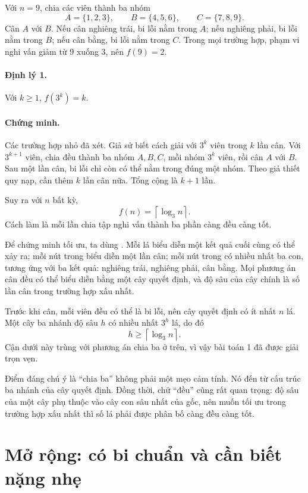 \documentclass[11pt]{article}
\begin{document}
Với \(n=9\), chia các viên thành ba nhóm
\[
  A=\{1,2,3\},\qquad B=\{4,5,6\},\qquad C=\{7,8,9\}.
\]
Cân \(A\) với \(B\). Nếu cân nghiêng trái, bi lỗi nằm trong \(A\); nếu nghiêng
phải, bi lỗi nằm trong \(B\); nếu cân bằng, bi lỗi nằm trong \(C\). Trong mọi
trường hợp, phạm vi nghi vấn giảm từ \(9\) xuống \(3\), nên \(f(9)=2\).

\paragraph{Định lý 1.}
Với \(k\ge 1\), \(f(3^k)=k\).

\paragraph{Chứng minh.}
Các trường hợp nhỏ đã xét. Giả sử biết cách giải với \(3^k\) viên trong
\(k\) lần cân. Với \(3^{k+1}\) viên, chia đều thành ba nhóm \(A,B,C\), mỗi
nhóm \(3^k\) viên, rồi cân \(A\) với \(B\). Sau một lần cân, bi lỗi chỉ còn
có thể nằm trong đúng một nhóm. Theo giả thiết quy nạp, cần thêm \(k\) lần cân
nữa. Tổng cộng là \(k+1\) lần.

Suy ra với \(n\) bất kỳ,
\[
  f(n)=\left\lceil \log_3 n \right\rceil .
\]
Cách làm là mỗi lần chia tập nghi vấn thành ba phần càng đều càng tốt.

Để chứng minh tối ưu, ta dùng . Mỗi lá biểu diễn một kết
quả cuối cùng có thể xảy ra; mỗi nút trong biểu diễn một lần cân; mỗi nút
trong có nhiều nhất ba con, tương ứng với ba kết quả: nghiêng trái, nghiêng
phải, cân bằng. Mọi phương án cân đều có thể biểu diễn bằng một cây quyết
định, và độ sâu của cây chính là số lần cân trong trường hợp xấu nhất.

Trước khi cân, mỗi viên đều có thể là bi lỗi, nên cây quyết định có ít nhất
\(n\) lá. Một cây ba nhánh độ sâu \(h\) có nhiều nhất \(3^h\) lá, do đó
\[
  h\ge \left\lceil \log_3 n \right\rceil .
\]
Cận dưới này trùng với phương án chia ba ở trên, vì vậy bài toán 1 đã được
giải trọn vẹn.

Điểm đáng chú ý là ``chia ba'' không phải một mẹo cảm tính. Nó đến từ cấu
trúc ba nhánh của cây quyết định. Đồng thời, chữ ``đều'' cũng rất quan trọng:
độ sâu của một cây phụ thuộc vào cây con sâu nhất của gốc, nên muốn tối ưu
trong trường hợp xấu nhất thì số lá phải được phân bố càng đều càng tốt.

\section{Mở rộng: có bi chuẩn và cần biết nặng nhẹ}
\end{document}
